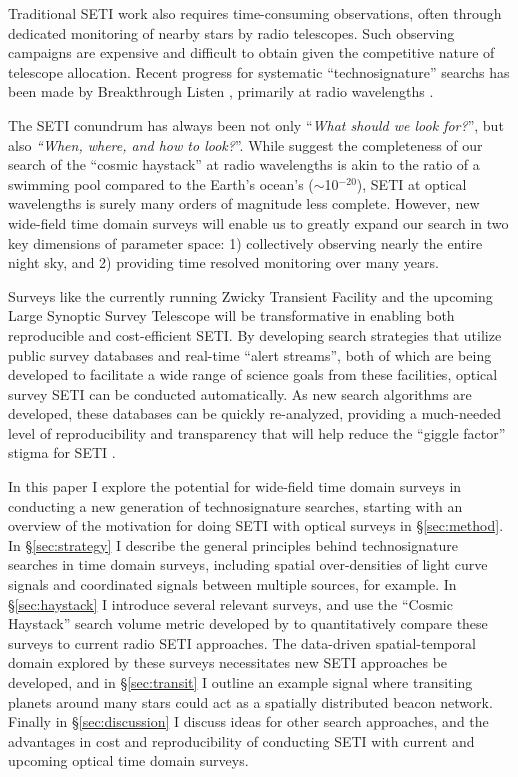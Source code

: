 \documentclass[twocolumn]{aastex62}
\begin{document}
Traditional SETI work also requires time-consuming observations, often through dedicated monitoring of nearby stars by radio telescopes. Such observing campaigns are expensive and difficult to obtain given the competitive nature of telescope allocation. Recent progress for systematic ``technosignature'' searchs has been made by Breakthrough Listen \citep{worden2017,isaacson2017}, primarily at radio wavelengths \citep[e.g.][]{price2018}. 


The SETI conundrum has always been not only ``{\it What should we look for?}'', but  also {\it ``When, where, and how to look?}''. 
While \citet{wright2018c} suggest the completeness of our search of the ``cosmic haystack'' at radio wavelengths is akin to the ratio of a swimming pool compared to the Earth's ocean's ($\sim$10$^{-20}$), SETI at optical wavelengths is surely many orders of magnitude less complete. However, new wide-field time domain surveys will enable us to greatly expand our search in two key dimensions of parameter space: 1) collectively observing nearly the entire night sky, and 2) providing time resolved monitoring over many years. 


Surveys like the currently running Zwicky Transient Facility \citep[ZTF][]{bellm2014} and the upcoming Large Synoptic Survey Telescope \citep[LSST][]{lsst} will be transformative in enabling both reproducible and cost-efficient SETI. By developing search strategies that utilize public survey databases and real-time ``alert streams'', both of which are being developed to facilitate a wide range of science goals from these facilities, optical survey SETI can be conducted automatically. As new search algorithms are developed, these databases can be quickly re-analyzed, providing a much-needed level of reproducibility and transparency that will help reduce the ``giggle factor'' stigma for SETI \citep{wright2018b}.


In this paper I explore the potential for wide-field time domain surveys in conducting a new generation of technosignature searches, starting with an overview of the motivation for doing SETI with optical surveys in \S\ref{sec:method}.
In \S\ref{sec:strategy} I describe the general principles behind technosignature searches in time domain surveys, including spatial over-densities of light curve signals and coordinated signals between multiple sources, for example.
In \S\ref{sec:haystack} I introduce several relevant surveys, and use the ``Cosmic Haystack'' search volume metric developed by \citet{wright2018c} to quantitatively compare these surveys to current radio SETI approaches. 
The data-driven spatial-temporal domain explored by these surveys necessitates new SETI approaches be developed, and in \S\ref{sec:transit} I outline an example signal where transiting planets around many stars could act as a spatially distributed beacon network.
Finally in \S\ref{sec:discussion} I discuss ideas for other search approaches, and the advantages in cost and reproducibility of conducting SETI with current and upcoming optical time domain surveys.
\end{document}
